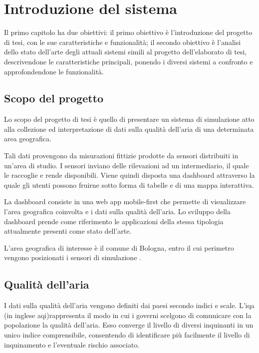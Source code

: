 \clearpage{\pagestyle{empty}\cleardoublepage}
\chapter{Introduzione del sistema}
\label{chapter:first}

\lhead[\fancyplain{}{\bfseries\thepage}]{\fancyplain{}{\bfseries\rightmark}}

Il primo capitolo ha due obiettivi:
il primo obiettivo è l'introduzione del progetto di tesi, con le sue caratteristiche e funzionalità;
il secondo obiettivo è l'analisi dello stato dell'arte degli attuali sistemi simili al progetto dell'elaborato di tesi,
descrivendone le caratteristiche principali, ponendo i diversi sistemi a confronto e approfondendone le funzionalità.

\section{Scopo del progetto}

Lo scopo del progetto di tesi è quello di presentare un sistema di simulazione atto alla collezione ed interpretazione
di dati sulla qualità dell'aria di una determinata area geografica.

Tali dati provengono da misurazioni fittizie prodotte da sensori distribuiti in un'area di studio.
I sensori inviano delle rilevazioni ad un intermediario, il quale le raccoglie e rende disponibili.
Viene quindi disposta una dashboard attraverso la quale gli utenti possono fruirne sotto forma di tabelle e
di una mappa interattiva.

La dashboard consiste in una web app mobile-first che permette di visualizzare l'area geografica coinvolta e
i dati sulla qualità dell'aria.
Lo sviluppo della dashboard prende come riferimento le applicazioni della stessa tipologia attualmente presenti
come stato dell'arte.

L'area geografica di interesse è il comune di Bologna, entro il cui perimetro vengono posizionati i sensori
di simulazione \cite{Accuweather}.

\section{Qualità dell'aria}

I dati sulla qualità dell'aria vengono definiti dai paesi secondo indici e scale.
L'\acrfull{iqa} (in inglese \acrlong{aqi})rappresenta il modo in cui i governi scelgono di comunicare con la popolazione
la qualità dell'aria. Esso converge il livello di diversi inquinanti in un unico indice comprensibile,
consentendo di identificare più facilmente il livello di inquinamento e l'eventuale rischio associato.

